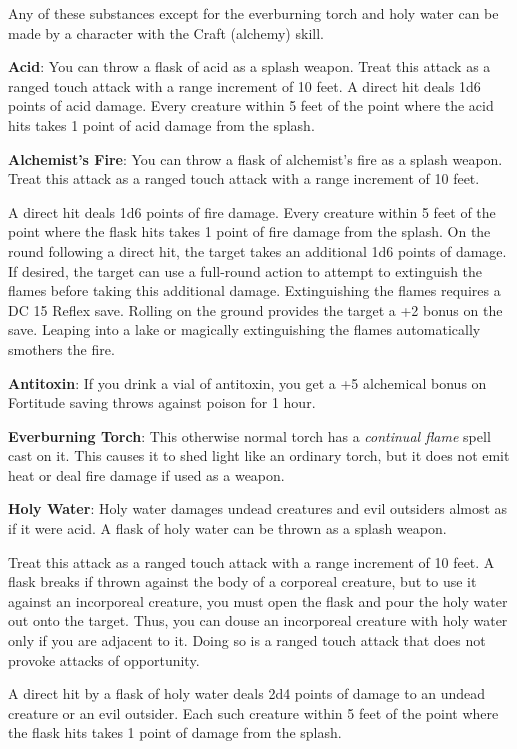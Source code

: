 		
Any of these substances except for the everburning torch and holy water can be made by a character with the Craft (alchemy) skill.
		
\textbf{Acid}: You can throw a flask of acid as a splash weapon. Treat this attack as a ranged touch attack with a range increment of 10 feet. A direct hit deals 1d6 points of acid damage. Every creature within 5 feet of the point where the acid hits takes 1 point of acid damage from the splash.
		
\textbf{Alchemist's Fire}: You can throw a flask of alchemist's fire as a splash weapon. Treat this attack as a ranged touch attack with a range increment of 10 feet.
		
A direct hit deals 1d6 points of fire damage. Every creature within 5 feet of the point where the flask hits takes 1 point of fire damage from the splash. On the round following a direct hit, the target takes an additional 1d6 points of damage. If desired, the target can use a full-round action to attempt to extinguish the flames before taking this additional damage. Extinguishing the flames requires a DC 15 Reflex save. Rolling on the ground provides the target a +2 bonus on the save. Leaping into a lake or magically extinguishing the flames automatically smothers the fire.
		
\textbf{Antitoxin}: If you drink a vial of antitoxin, you get a +5 alchemical bonus on Fortitude saving throws against poison for 1 hour.
		
\textbf{Everburning Torch}: This otherwise normal torch has a \textit{continual flame} spell cast on it. This causes it to shed light like an ordinary torch, but it does not emit heat or deal fire damage if used as a weapon. 
		
\textbf{Holy Water}: Holy water damages undead creatures and evil outsiders almost as if it were acid. A flask of holy water can be thrown as a splash weapon.
		
Treat this attack as a ranged touch attack with a range increment of 10 feet. A flask breaks if thrown against the body of a corporeal creature, but to use it against an incorporeal creature, you must open the flask and pour the holy water out onto the target. Thus, you can douse an incorporeal creature with holy water only if you are adjacent to it. Doing so is a ranged touch attack that does not provoke attacks of opportunity.
		
A direct hit by a flask of holy water deals 2d4 points of damage to an undead creature or an evil outsider. Each such creature within 5 feet of the point where the flask hits takes 1 point of damage from the splash.
		
